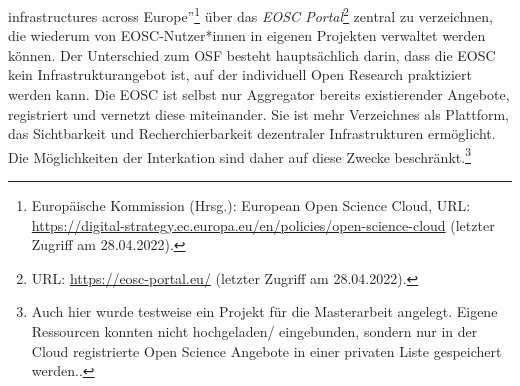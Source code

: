 \begin{enumerate}
infrastructures across Europe''\footnote{Europäische Kommission (Hrsg.): European Open Science Cloud, URL: \url{https://digital-strategy.ec.europa.eu/en/policies/open-science-cloud} (letzter Zugriff am 28.04.2022).} über das \textit{EOSC Portal}\footnote{URL: \url{https://eosc-portal.eu/} (letzter Zugriff am 28.04.2022).} zentral zu verzeichnen, die wiederum von EOSC-Nutzer*innen in eigenen Projekten verwaltet werden können. Der Unterschied zum OSF besteht hauptsächlich darin, dass die EOSC kein Infrastrukturangebot ist, auf der individuell Open Research praktiziert werden kann. Die EOSC ist selbst nur Aggregator bereits existierender Angebote, registriert und vernetzt diese miteinander. Sie ist mehr Verzeichnes als Plattform, das Sichtbarkeit und Recherchierbarkeit dezentraler Infrastrukturen ermöglicht. Die Möglichkeiten der Interkation sind daher auf diese Zwecke beschränkt.\footnote{Auch hier wurde testweise ein Projekt für die Masterarbeit angelegt. Eigene Ressourcen konnten nicht hochgeladen/ eingebunden, sondern nur in der Cloud registrierte Open Science Angebote in einer privaten Liste gespeichert werden..}


\end{enumerate}
